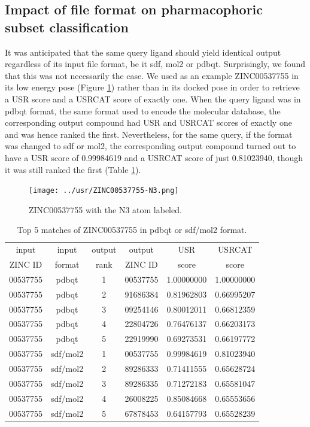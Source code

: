 \subsection{Impact of file format on pharmacophoric subset classification}

It was anticipated that the same query ligand should yield identical output regardless of its input file format, be it sdf, mol2 or pdbqt. Surprisingly, we found that this was not necessarily the case. We used as an example ZINC00537755 in its low energy pose (Figure \ref{usr:ZINC00537755-N3}) rather than in its docked pose in order to retrieve a USR score and a USRCAT score of exactly one. When the query ligand was in pdbqt format, the same format used to encode the molecular database, the corresponding output compound had USR and USRCAT scores of exactly one and was hence ranked the first. Nevertheless, for the same query, if the format was changed to sdf or mol2, the corresponding output compound turned out to have a USR score of 0.99984619 and a USRCAT score of just 0.81023940, though it was still ranked the first (Table \ref{usr:ZINC00537755-Top5}).

\begin{figure}
\centering
\texttt{[image: ../usr/ZINC00537755-N3.png]}
\caption{ZINC00537755 with the N3 atom labeled.}
\label{usr:ZINC00537755-N3}
\end{figure}

\begin{table}
\caption{Top 5 matches of ZINC00537755 in pdbqt or sdf/mol2 format.}
\label{usr:ZINC00537755-Top5}
\begin{tabular}{cccccc}
\hline
input    & input  & output & output   & USR   & USRCAT\\
ZINC ID  & format & rank   & ZINC ID  & score & score\\
\hline
00537755 & pdbqt    & 1 & 00537755 & 1.00000000 & 1.00000000\\
00537755 & pdbqt    & 2 & 91686384 & 0.81962803 & 0.66995207\\
00537755 & pdbqt    & 3 & 09254146 & 0.80012011 & 0.66812359\\
00537755 & pdbqt    & 4 & 22804726 & 0.76476137 & 0.66203173\\
00537755 & pdbqt    & 5 & 22919990 & 0.69273531 & 0.66197772\\
00537755 & sdf/mol2 & 1 & 00537755 & 0.99984619 & 0.81023940\\
00537755 & sdf/mol2 & 2 & 89286333 & 0.71411555 & 0.65628724\\
00537755 & sdf/mol2 & 3 & 89286335 & 0.71272183 & 0.65581047\\
00537755 & sdf/mol2 & 4 & 26008225 & 0.85084668 & 0.65553656\\
00537755 & sdf/mol2 & 5 & 67878453 & 0.64157793 & 0.65528239\\
\hline
\end{tabular}
\end{table}

